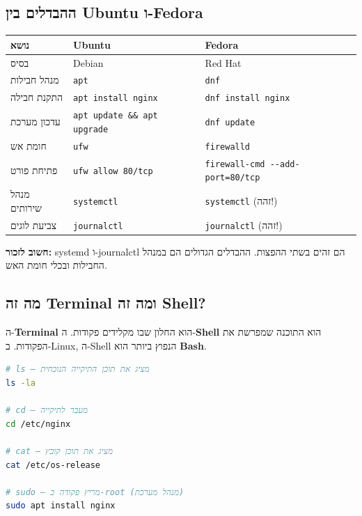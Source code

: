 \documentclass[12pt,a4paper]{article}
\begin{document}
\subsection{ההבדלים בין Ubuntu ו-Fedora}

\begin{center}
\begin{tabular}{lll}
\toprule
\textbf{נושא} & \textbf{Ubuntu} & \textbf{Fedora} \\
\midrule
בסיס & Debian & Red Hat \\
מנהל חבילות & \texttt{apt} & \texttt{dnf} \\
התקנת חבילה & \texttt{apt install nginx} & \texttt{dnf install nginx} \\
עדכון מערכת & \texttt{apt update \&\& apt upgrade} & \texttt{dnf update} \\
חומת אש & \texttt{ufw} & \texttt{firewalld} \\
פתיחת פורט & \texttt{ufw allow 80/tcp} & \texttt{firewall-cmd -{}-add-port=80/tcp} \\
מנהל שירותים & \texttt{systemctl} & \texttt{systemctl} (זהה!) \\
צביעת לוגים & \texttt{journalctl} & \texttt{journalctl} (זהה!) \\
\bottomrule
\end{tabular}
\end{center}

\begin{infobox}
\textbf{חשוב לזכור:} systemd ו-journalctl הם זהים בשתי ההפצות. ההבדלים הגדולים הם במנהל החבילות ובכלי חומת האש.
\end{infobox}

\subsection{מה זה Terminal ומה זה Shell?}

ה-\textbf{Terminal} הוא החלון שבו מקלידים פקודות. ה-\textbf{Shell} הוא התוכנה שמפרשת את הפקודות. ב-Linux, ה-Shell הנפוץ ביותר הוא \textbf{Bash}.

\begin{lstlisting}[language=bash, caption={דוגמה לפקודות בסיסיות ב-Bash}]
# ls — מציג את תוכן התיקייה הנוכחית
ls -la

# cd — מעבר לתיקייה
cd /etc/nginx

# cat — מציג את תוכן קובץ
cat /etc/os-release

# sudo — מריץ פקודה כ-root (מנהל מערכת)
sudo apt install nginx
\end{lstlisting}
\end{document}
